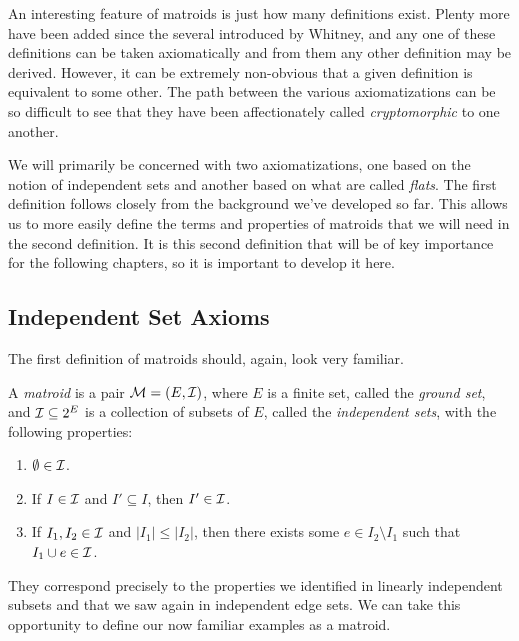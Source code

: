 \documentclass[12pt,oneside]{../../sfsuthesis}
\begin{document}
An interesting feature of matroids is just how many definitions exist.
Plenty more have been added since the several introduced by Whitney, and
any one of these definitions can be taken axiomatically and from them any other definition may be derived.
However, it can be extremely non-obvious that a given definition is equivalent to some other.
The path between the various axiomatizations can be so difficult to see that they have been affectionately called \textit{cryptomorphic} to one another.

We will primarily be concerned with two axiomatizations, one based on the notion of independent sets and another based on what are called \emph{flats}.
The first definition follows closely from the background we've developed so far.
This allows us to more easily define the terms and properties of matroids that we will need in the second definition.
It is this second definition that will be of key importance for the following chapters, so it is important to develop it here.

\subsection{Independent Set Axioms}

The first definition of matroids should, again, look very familiar.

\begin{definition}\th\label{def:MatroidIndpendentAxioms}
    A \emph{matroid} is a pair  \( \mathcal{M} = (E, \mathcal{I}) \), where \( E \) is a finite set, called the \emph{ground set}, and \( \mathcal{I} \subseteq 2^E \) is a collection of subsets of \( E \), called the \emph{independent sets}, with the following properties:
    \begin{enumerate}[label=(I\arabic*)]
        \item \( \emptyset \in \mathcal{I} \).
        \item If \( I \in \mathcal{I} \) and \( I' \subseteq I \), then \( I' \in \mathcal{I} \).
        \item If \( I_1, I_2 \in \mathcal{I} \) and \( |I_1| \leq |I_2|\), then there exists some \( e \in I_2 \setminus I_1 \)
              such that \( I_1 \cup e \in \mathcal{I} \).
    \end{enumerate}
\end{definition}

They correspond precisely to the properties we identified in linearly independent subsets and that we saw again in independent edge sets.
We can take this opportunity to define our now familiar examples as a matroid.
\end{document}

